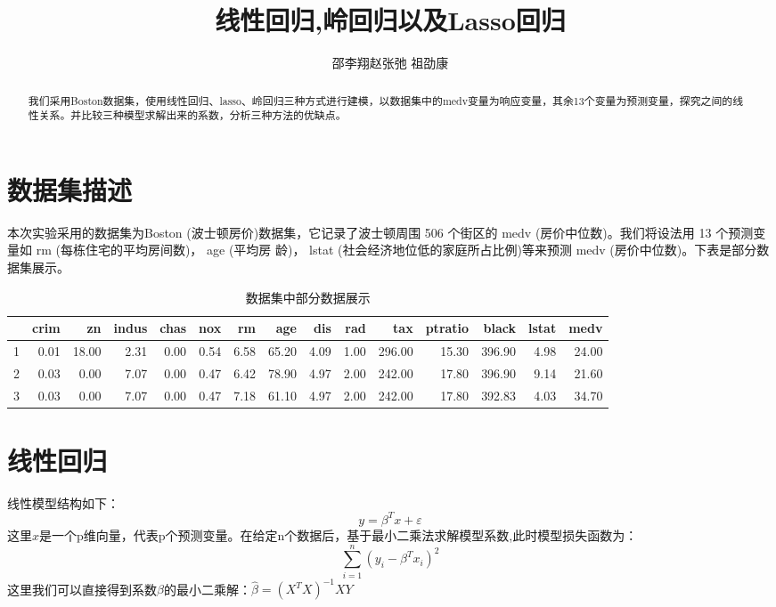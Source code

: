 \documentclass[cn]{elegantpaper}
\author{邵李翔\quad 赵张弛 \quad 祖劭康}
\title{线性回归,岭回归以及Lasso回归}
\date{}
\begin{document}
    
\maketitle
\begin{abstract}
  我们采用Boston数据集，使用线性回归、lasso、岭回归三种方式进行建模，以数据集中的medv变量为响应变量，其余13个变量为预测变量，探究之间的线性关系。并比较三种模型求解出来的系数，分析三种方法的优缺点。
\end{abstract}
\section{数据集描述}
本次实验采用的数据集为Boston (波士顿房价)数据集，它记录了波士顿周围 506 个街区的 medv
(房价中位数)。我们将设法用 13 个预测变量如 rm (每栋住宅的平均房间数)， age (平均房
龄)， lstat (社会经济地位低的家庭所占比例)等来预测 medv (房价中位数)。下表是部分数据集展示。
\begin{table}[ht]
    \centering
    \caption{数据集中部分数据展示}
    \begin{tabular}{rrrrrrrrrrrrrrr}
      \hline
     & crim & zn & indus & chas & nox & rm & age & dis & rad & tax & ptratio & black & lstat & medv \\ 
      \hline
    1 & 0.01 & 18.00 & 2.31 & 0.00 & 0.54 & 6.58 & 65.20 & 4.09 & 1.00 & 296.00 & 15.30 & 396.90 & 4.98 & 24.00 \\ 
      2 & 0.03 & 0.00 & 7.07 & 0.00 & 0.47 & 6.42 & 78.90 & 4.97 & 2.00 & 242.00 & 17.80 & 396.90 & 9.14 & 21.60 \\ 
      3 & 0.03 & 0.00 & 7.07 & 0.00 & 0.47 & 7.18 & 61.10 & 4.97 & 2.00 & 242.00 & 17.80 & 392.83 & 4.03 & 34.70 \\ 
       \hline
    \end{tabular}
\end{table}

\section{线性回归}
线性模型结构如下：
\begin{equation}
  y = \beta^Tx+ \varepsilon
\end{equation}
这里$x$是一个p维向量，代表p个预测变量。在给定n个数据后，基于最小二乘法求解模型系数,此时模型损失函数为：
\begin{equation}
  \sum_{i=1}^n(y_i-\beta^Tx_i)^2
\end{equation}
这里我们可以直接得到系数$\beta$的最小二乘解：$\hat{\beta}=(X^TX)^{-1}XY$
\end{document}
